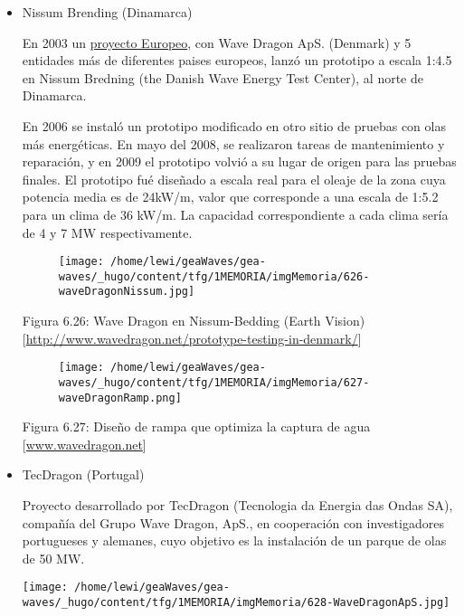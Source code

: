 \documentclass[]{article}
\begin{document}
\begin{itemize}
  \begin{itemize}
  \item
    Nissum Brending (Dinamarca)

    En 2003 un
    \href{\%5Bhttp://www.wavedragon.net/sea-testing-and-optimisation-of-power-production-on-a-scale-14-5-test-rig-of-the-offshore-wave-energy-converter-wave-dragon/}{proyecto
    Europeo}, con Wave Dragon ApS. (Denmark) y 5 entidades más de
    diferentes paises europeos, lanzó un prototipo a escala 1:4.5 en
    Nissum Bredning (the Danish Wave Energy Test Center), al norte de
    Dinamarca.

    En 2006 se instaló un prototipo modificado en otro sitio de pruebas
    con olas más energéticas. En mayo del 2008, se realizaron tareas de
    mantenimiento y reparación, y en 2009 el prototipo volvió a su lugar
    de origen para las pruebas finales. El prototipo fué diseñado a
    escala real para el oleaje de la zona cuya potencia media es de
    24kW/m, valor que corresponde a una escala de 1:5.2 para un clima de
    36 kW/m. La capacidad correspondiente a cada clima sería de 4 y 7 MW
    respectivamente.

    \begin{figure}
    \centering
    \texttt{[image: /home/lewi/geaWaves/gea-waves/\_hugo/content/tfg/1MEMORIA/imgMemoria/626-waveDragonNissum.jpg]}
    \caption{}
    \end{figure}

    Figura 6.26: Wave Dragon en Nissum-Bedding (Earth Vision)
    {[}\url{http://www.wavedragon.net/prototype-testing-in-denmark/}{]}

    \begin{figure}
    \centering
    \texttt{[image: /home/lewi/geaWaves/gea-waves/\_hugo/content/tfg/1MEMORIA/imgMemoria/627-waveDragonRamp.png]}
    \caption{}
    \end{figure}

    Figura 6.27: Diseño de rampa que optimiza la captura de agua
    {[}\url{www.wavedragon.net}{]} 
  \item
    TecDragon (Portugal)

    Proyecto desarrollado por TecDragon (Tecnologia da Energia das Ondas
    SA), compañía del Grupo Wave Dragon, ApS., en cooperación con
    investigadores portugueses y alemanes, cuyo objetivo es la
    instalación de un parque de olas de 50 MW.

    \texttt{[image: /home/lewi/geaWaves/gea-waves/\_hugo/content/tfg/1MEMORIA/imgMemoria/628-WaveDragonApS.jpg]}


\end{itemize}
\end{itemize}
\end{document}
